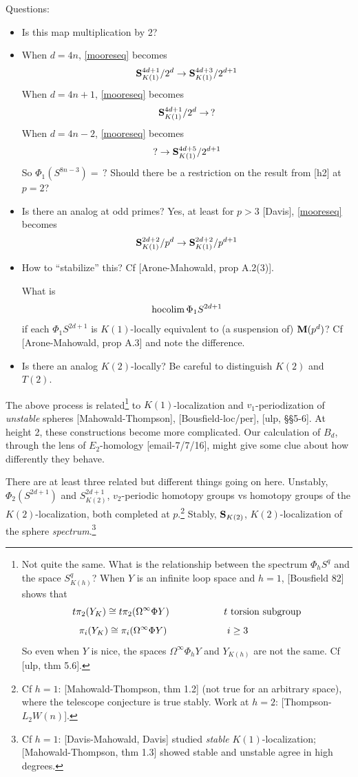 \documentclass{rs}
\theoremstyle{definition}
\theoremstyle{remark}
\newcommand{\hocolim}{{\rm hocolim}\,}
\newcommand{\bm}{{\bf M}}
\newcommand{\bs}{{\bf S}}
\renewcommand{\=}{\approx}
\renewcommand{\-}{\sim}
\numberwithin{equation}{section}
\numberwithin{thm}{section}
\begin{document}
Questions: 
\begin{itemize}
 \item Is this map multiplication by 2?  

 \item When $d = 4 n$, \eqref{mooreseq} becomes 
 \[
  \bs_{K(1)}^{4 d + 1} / 2^d \to \bs_{K(1)}^{4 d + 3} / 2^{d + 1} 
 \]
 When $d = 4 n + 1$, \eqref{mooreseq} becomes 
 \[
  \bs_{K(1)}^{4 d + 1} / 2^d \to \, ? 
 \]
 When $d = 4 n - 2$, \eqref{mooreseq} becomes 
 \[
  ? \to \bs_{K(1)}^{4 d + 5} / 2^{d + 1} 
 \]
 So $\Phi_1(S^{8 n - 3}) = \, ?$  
 Should there be a restriction on the result from [h2] at $p = 2$?  

 \item Is there an analog at odd primes?  
 Yes, at least for $p > 3$ [Davis], \eqref{mooreseq} becomes 
 \[
  \bs_{K(1)}^{2 d + 2} / p^d \to \bs_{K(1)}^{2 d + 2} / p^{d + 1} 
 \]

 \item How to ``stabilize'' this?  Cf [Arone-Mahowald, prop A.2(3)].  

 What is 
 \[
  \hocolim \Phi_1 S^{2 d + 1} 
 \]
 if each $\Phi_1 S^{2 d + 1}$ is $K(1)$-locally equivalent to (a suspension of) $\bm(p^d)$?  
 Cf [Arone-Mahowald, prop A.3] and note the difference.  

 \item Is there an analog $K(2)$-locally?  Be careful to distinguish $K(2)$ and $T(2)$.
\end{itemize}

The above process is related\footnote{Not quite the same.  
What is the relationship between the spectrum $\Phi_h S^q$ and the space $S^q_{K(h)}$?  
When $Y$ is an infinite loop space and $h = 1$, [Bousfield 82] shows that 
\[
 t\pi_2(Y_K) \cong t\pi_2(\Omega^\infty \Phi Y) \hskip 2cm \text{$t$ torsion subgroup} 
\]
\[
 \hskip -1.7cm \pi_i(Y_K) \cong \pi_i(\Omega^\infty \Phi Y) \hskip 2.2cm i \geq 3 
\]
So even when $Y$ is nice, the spaces $\Omega^\infty \Phi_h Y$ and $Y_{K(h)}$ are not the same.  
Cf [ulp, thm 5.6].  } 
to $K(1)$-localization and $v_1$-periodization of {\em unstable} spheres 
[Mahowald-Thompson], [Bousfield-loc/per], [ulp, \S\S 5-6].  
At height 2, these constructions become more complicated.  
Our calculation of $B_d$, through the lens of $E_2$-homology [email-7/7/16], 
might give some clue about how differently they behave.  

There are at least three related but different things going on here.  
Unstably, $\Phi_2(S^{2d+1})$ and $S^{2d+1}_{K(2)}$, 
$v_2$-periodic homotopy groups vs homotopy groups of the $K(2)$-localization, 
both completed at $p$.\footnote{Cf $h=1$: 
[Mahowald-Thompson, thm 1.2] (not true for an arbitrary space), 
where the telescope conjecture is true stably.  
Work at $h=2$: [Thompson-$L_2W(n)$].  }  
Stably, $\bs_{K(2)}$, $K(2)$-localization of the sphere {\em spectrum}.\footnote{Cf $h=1$: 
[Davis-Mahowald, Davis] studied {\em stable} $K(1)$-localization; 
[Mahowald-Thompson, thm 1.3] showed stable and unstable agree in high degrees.  }  
\end{document}
